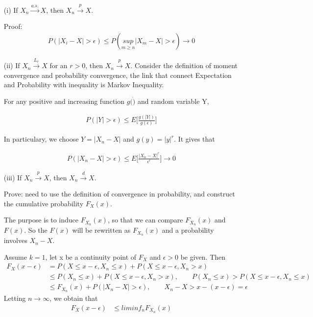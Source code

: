 \documentclass[11pt]{article} %
\begin{document}
\begin{itemize}
\item[(i)] If $X_n \xrightarrow {a.s.} X$, then $X_n \xrightarrow {p} X$. 

Proof: 
 \begin{align*}
   P(\Big | X_i - X \Big | > \epsilon) \leq P(\underset{m \geq n}{sup} \Big | X_m - X \Big | > \epsilon) \rightarrow 0
 \end{align*}
 
 
\item[(ii)] If $X_n \xrightarrow {L_r} X$ for an $r>0$, then $X_n \xrightarrow {p} X$. 
Consider the definition of moment convergence and probability convergence, the link that connect Expectation and Probability with inequality is Markov Inequality.

For any positive and increasing function $g(\dot)$ and random variable Y, 

 \begin{align*}
   P(\Big | Y \Big | > \epsilon) \leq E \Big[ \frac{g(|Y|)}{g(\epsilon)} \Big]
 \end{align*}

In particulary, we choose $Y= \Big | X_n -X \Big |$ and $g(y) = |y|^{r}$. It gives that

 \begin{align*}
   P(\Big | X_n - X \Big | > \epsilon) \leq E \Big[ \frac{\Big | X_n - X\Big |^r}{\epsilon^r} \Big] \rightarrow 0
 \end{align*}
 

\item[(iii)] If $X_n \xrightarrow {p} X$, then $X_n \xrightarrow {d} X$. 

Prove: need to use the definition of convergence in probability, and construct the cumulative probability $F_X(x)$.

The purpose is to induce $F_{X_n}(x)$, so that we can compare $F_{X_n}(x)$ and $F(x)$. So the $F(x)$ will be rewritten as $F_{X_n}(x)$ and a probability involves $X_n - X$.


Assume $k=1$, let x be a continuity point of $F_X$ and $\epsilon > 0$ be given. Then
 \begin{align*}
   F_X(x - \epsilon) &= P(X \leq x - \epsilon, X_n \leq x) +  P(X \leq x - \epsilon, X_n > x)  \\
   & \leq P(X_n \leq x) + P(X \leq x - \epsilon, X_n > x), \qquad  P(X_n \leq x) > P(X \leq x - \epsilon, X_n \leq x) \\
   & \leq F_{X_n}(x) + P(|X_n - X| > \epsilon), \qquad X_n - X > x - (x-\epsilon) = \epsilon 
 \end{align*}
Letting $n \rightarrow \infty$, we obtain that 
 \begin{align*}
   F_X(x - \epsilon) & \leq lim inf_{n} F_{X_n} (x) \\
 \end{align*}


\end{itemize}
\end{document}
